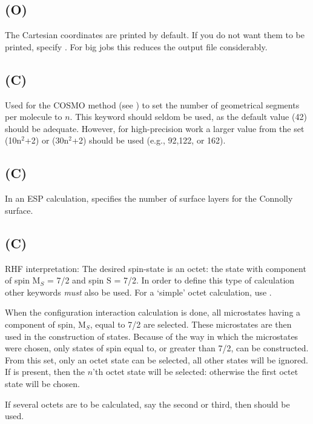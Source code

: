 \subsection*{ (O)}
        The Cartesian coordinates are printed by default.   If  you  do  not
   want  them  to  be printed, specify .  For big jobs this reduces the
   output file considerably.

\subsection*{ (C)}
Used for the COSMO method (see ) to set the number of
geometrical segments per molecule to $n$.  This keyword should seldom be
used, as the default value (42) should be adequate.
However, for high-precision work a larger value from the set (10n$^2$+2) or (30n$^2$+2)
 should be used (e.g., 92,122, or 162).



\subsection*{ (C)}
        In an ESP calculation,    specifies  the  number  of  surface
   layers for the Connolly surface.

\subsection*{ (C)}
        RHF interpretation:  The desired spin-state is an octet:  the  state
   with component of spin M$_S$ = 7/2 and spin S = 7/2.
In order to define this type of calculation
other keywords {\em must} also be used.  For a `simple' octet  calculation,
use .


 When the configuration interaction calculation is done, all microstates having
a component of spin,  M$_S$, equal to 7/2 are selected.  These microstates are then
used in the construction of states.  Because of the way in which the microstates
were chosen, only states of spin equal to, or greater than 7/2, can be constructed.
From this set, only an octet state can be selected, all other states will be ignored.
  If  is present, then the $n$'th octet  state will be selected:
otherwise the first octet  state will be  chosen.

     If several octets are to be calculated, say the second
   or third, then  should be used.


